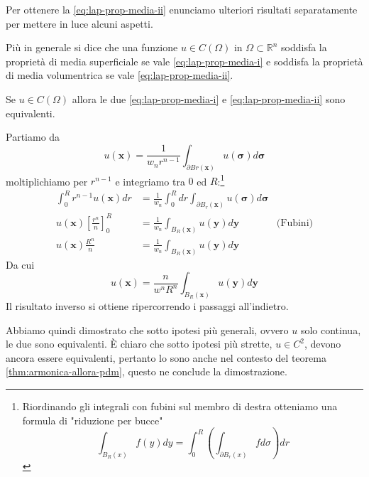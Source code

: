 \documentclass[10pt,a4paper,twoside,openright]{book}
\newcommand{\x}{\mathbf{x}}
\newcommand{\y}{\mathbf{y}}
\begin{document}
\begin{dimostrazione}
	Per ottenere la \eqref{eq:lap-prop-media-ii} enunciamo ulteriori risultati separatamente per mettere in luce alcuni aspetti.
\end{dimostrazione}

\begin{definition}[PDM]
	Più in generale si dice che una funzione $u\in C( \Omega )$ in $\Omega \subset \mathbb{R}^{n}$ soddisfa la proprietà di media superficiale se vale \eqref{eq:lap-prop-media-i} e soddisfa la proprietà di media volumentrica se vale \eqref{eq:lap-prop-media-ii}.
\end{definition}
\begin{theorem}
	Se $u\in C( \Omega )$ allora le due \eqref{eq:lap-prop-media-i} e \eqref{eq:lap-prop-media-ii} sono equivalenti.
\end{theorem}
\begin{dimostrazione}
	Partiamo da
	\begin{equation*}
		u(\x) =\frac{1}{w_{n} r^{n-1}}\int _{\partial Br(\x)} u(\bm{\sigma }) d\bm{\sigma }
	\end{equation*}
	moltiplichiamo per $r^{n-1}$ e integriamo tra $0$ ed $R$:\footnote{Riordinando gli integrali con fubini sul membro di destra otteniamo una formula di "riduzione per bucce" 
	\begin{equation*}
		\int _{B_{R}( x)} f( y) dy=\int _{0}^{R}\left(\int _{\partial B_{r}( x)} fd\sigma \right) dr
	\end{equation*}
	}
	\begin{align*}
		\int _{0}^{R} r^{n-1} u(\x) dr & =\frac{1}{w_{n}}\int _{0}^{R} dr\int _{\partial B_{r}(\x)} u(\bm{\sigma }) d\bm{\sigma } & \\
		u(\x)\left[\frac{r^{n}}{n}\right]_{0}^{R} & =\frac{1}{w_{n}}\int _{B_{R}(\x)} u(\y) d\y & \text{(Fubini)}\\
		u(\x)\frac{R^{n}}{n} & =\frac{1}{w_{n}}\int _{B_{R}(\x)} u(\y) d\y & 
	\end{align*}
	Da cui 
	\begin{equation*}
		u(\x) =\frac{n}{w^{n} R^{n}}\int _{B_{R}(\x)} u(\y) d\y
	\end{equation*}
	Il risultato inverso si ottiene ripercorrendo i passaggi all'indietro.
\end{dimostrazione}
Abbiamo quindi dimostrato che sotto ipotesi più generali, ovvero $u$ solo continua, le due sono equivalenti. È chiaro che sotto ipotesi più strette, $u\in C^{2}$, devono ancora essere equivalenti, pertanto lo sono anche nel contesto del teorema \ref{thm:armonica-allora-pdm}, questo ne conclude la dimostrazione.
\end{document}

